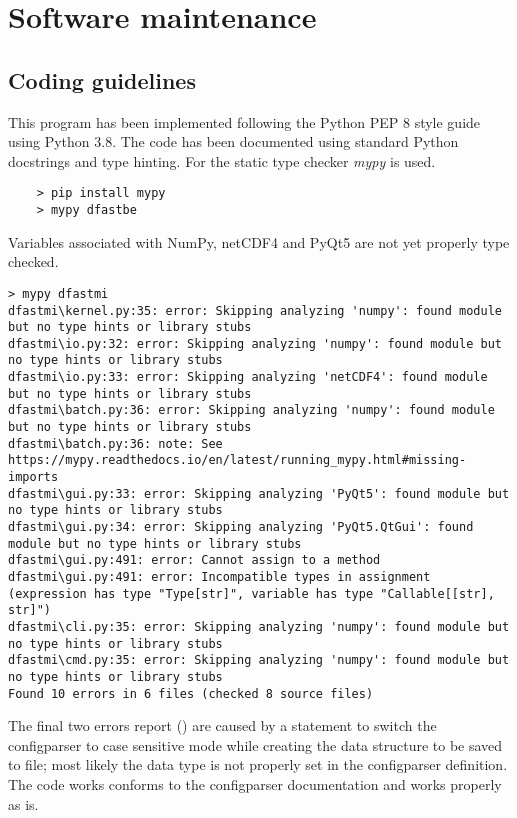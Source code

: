 \chapter{Software maintenance}

\section{Coding guidelines}

This program has been implemented following the Python PEP 8 style guide using Python 3.8.
The code has been documented using standard Python docstrings and type hinting.
For the static type checker \emph{mypy} is used.

\begin{Verbatim}
    > pip install mypy
    > mypy dfastbe
\end{Verbatim}

Variables associated with NumPy, netCDF4 and PyQt5 are not yet properly type checked.

\begin{Verbatim}[fontsize=\tiny]
> mypy dfastmi
dfastmi\kernel.py:35: error: Skipping analyzing 'numpy': found module but no type hints or library stubs
dfastmi\io.py:32: error: Skipping analyzing 'numpy': found module but no type hints or library stubs
dfastmi\io.py:33: error: Skipping analyzing 'netCDF4': found module but no type hints or library stubs
dfastmi\batch.py:36: error: Skipping analyzing 'numpy': found module but no type hints or library stubs
dfastmi\batch.py:36: note: See https://mypy.readthedocs.io/en/latest/running_mypy.html#missing-imports
dfastmi\gui.py:33: error: Skipping analyzing 'PyQt5': found module but no type hints or library stubs
dfastmi\gui.py:34: error: Skipping analyzing 'PyQt5.QtGui': found module but no type hints or library stubs
dfastmi\gui.py:491: error: Cannot assign to a method
dfastmi\gui.py:491: error: Incompatible types in assignment (expression has type "Type[str]", variable has type "Callable[[str], str]")
dfastmi\cli.py:35: error: Skipping analyzing 'numpy': found module but no type hints or library stubs
dfastmi\cmd.py:35: error: Skipping analyzing 'numpy': found module but no type hints or library stubs
Found 10 errors in 6 files (checked 8 source files)
\end{Verbatim}

The final two errors report () are caused by a statement to switch the configparser to case sensitive mode while creating the data structure to be saved to file; most likely the data type is not properly set in the configparser definition.
The code works conforms to the configparser documentation and works properly as is.

